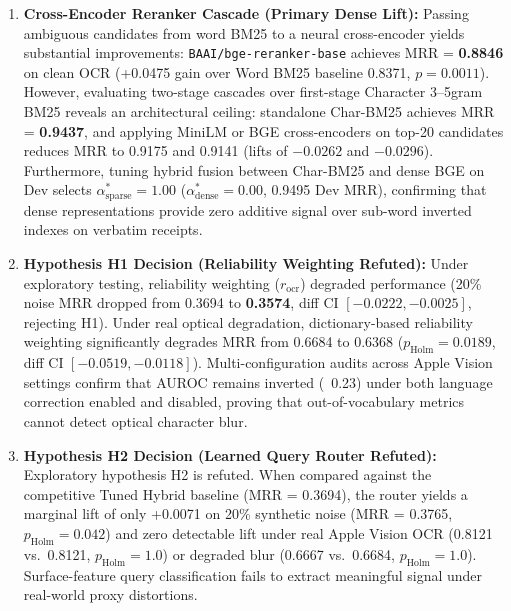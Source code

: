 \documentclass[conference]{IEEEtran}
\begin{document}
\begin{enumerate}
    \setlength{\itemsep}{0.2pt plus 0.1pt}
    \setlength{\parskip}{0pt}
    \item \textbf{Cross-Encoder Reranker Cascade (Primary Dense Lift):} Passing ambiguous candidates from word BM25 to a neural cross-encoder yields substantial improvements: \texttt{BAAI/bge-reranker-base} achieves MRR = \textbf{0.8846} on clean OCR (+0.0475 gain over Word BM25 baseline 0.8371, $p = 0.0011$). However, evaluating two-stage cascades over first-stage Character 3--5gram BM25 reveals an architectural ceiling: standalone Char-BM25 achieves MRR = \textbf{0.9437}, and applying MiniLM or BGE cross-encoders on top-20 candidates reduces MRR to 0.9175 and 0.9141 (lifts of $-0.0262$ and $-0.0296$). Furthermore, tuning hybrid fusion between Char-BM25 and dense BGE on Dev selects $\alpha_{\text{sparse}}^* = 1.00$ ($\alpha_{\text{dense}}^* = 0.00$, 0.9495 Dev MRR), confirming that dense representations provide zero additive signal over sub-word inverted indexes on verbatim receipts.
    \item \textbf{Hypothesis H1 Decision (Reliability Weighting Refuted):} Under exploratory testing, reliability weighting ($r_{\text{ocr}}$) degraded performance (20\% noise MRR dropped from 0.3694 to \textbf{0.3574}, diff CI $[-0.0222, -0.0025]$, rejecting H1). Under real optical degradation, dictionary-based reliability weighting significantly degrades MRR from 0.6684 to 0.6368 ($p_{\text{Holm}} = 0.0189$, diff CI $[-0.0519, -0.0118]$). Multi-configuration audits across Apple Vision settings confirm that AUROC remains inverted (~0.23) under both language correction enabled and disabled, proving that out-of-vocabulary metrics cannot detect optical character blur.
    \item \textbf{Hypothesis H2 Decision (Learned Query Router Refuted):} Exploratory hypothesis H2 is refuted. When compared against the competitive Tuned Hybrid baseline (MRR = 0.3694), the router yields a marginal lift of only +0.0071 on 20\% synthetic noise (MRR = 0.3765, $p_{\text{Holm}} = 0.042$) and zero detectable lift under real Apple Vision OCR (0.8121 vs.\ 0.8121, $p_{\text{Holm}} = 1.0$) or degraded blur (0.6667 vs.\ 0.6684, $p_{\text{Holm}} = 1.0$). Surface-feature query classification fails to extract meaningful signal under real-world proxy distortions.
\end{enumerate}
\end{document}
